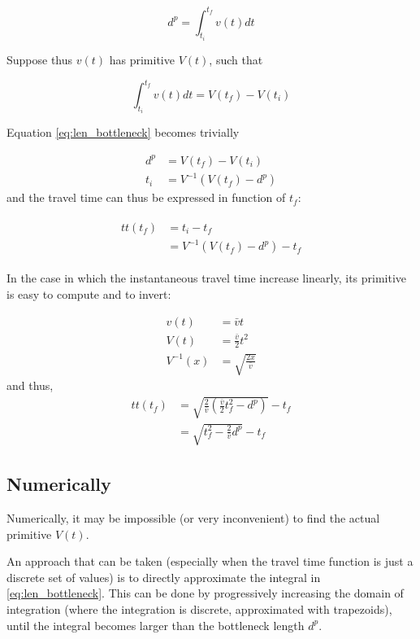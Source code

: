 \documentclass{article}
\begin{document}
\begin{equation}
  \label{eq:len_bottleneck}
  d^p = \int_{t_i}^{t_f}v(t) dt
\end{equation}

Suppose thus \(v(t)\) has primitive \(V(t)\), such that

\begin{equation}
  \label{eq:primitive}
  \int_{t_i}^{t_f}v(t) dt = V(t_f) - V(t_i)
\end{equation}

Equation \eqref{eq:len_bottleneck} becomes trivially

\begin{align*}
  d^p & = V(t_f) - V(t_i) \\
  t_i & = V^{-1}(V(t_f) - d^p)
\end{align*}
and the travel time can thus be expressed in function of \(t_f\):

\begin{align*}
  \begin{split}
    \label{eq:travel_time}
    tt(t_f) & = t_i - t_f \\
    & = V^{-1}(V(t_f) - d^p) - t_f
  \end{split}
\end{align*}

In the case in which the instantaneous travel time increase linearly, its primitive is easy to compute and to invert:

\begin{align*}
  v(t) & = \bar{v}t \\
  V(t) & = \frac{\bar{v}}{2}t^2 \\
  V^{-1}(x) & = \sqrt{\frac{2x}{\bar{v}}}
\end{align*}
and thus,
\begin{align*}
  tt(t_f) & = \sqrt{\frac{2}{\bar{v}}\left(\frac{\bar{v}}{2}t_f^2 - d^p\right)} - t_f \\
  & = \sqrt{t_f^2 - \frac{2}{\bar{v}}d^p} - t_f
\end{align*}

\subsection{Numerically}

Numerically, it may be impossible (or very inconvenient) to find the actual primitive \(V(t)\).

An approach that can be taken (especially when the travel time function is just a discrete set of values) is to directly approximate the integral in \eqref{eq:len_bottleneck}.
This can be done by progressively increasing the domain of integration (where the integration is discrete, approximated with trapezoids),
until the integral becomes larger than the bottleneck length \(d^p\).
\end{document}
